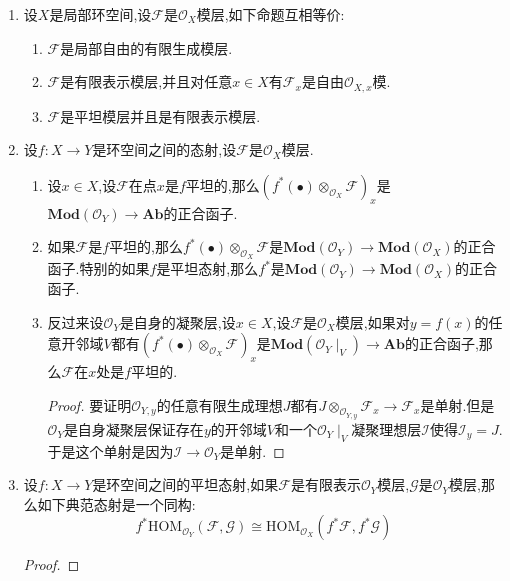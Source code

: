 \begin{enumerate}
	\item 设$X$是局部环空间,设$\mathscr{F}$是$\mathscr{O}_X$模层,如下命题互相等价:
	\begin{enumerate}
		\item $\mathscr{F}$是局部自由的有限生成模层.
		\item $\mathscr{F}$是有限表示模层,并且对任意$x\in X$有$\mathscr{F}_x$是自由$\mathscr{O}_{X,x}$模.
		\item $\mathscr{F}$是平坦模层并且是有限表示模层.
	\end{enumerate}
	\item 设$f:X\to Y$是环空间之间的态射,设$\mathscr{F}$是$\mathscr{O}_X$模层.
	\begin{enumerate}[(1)]
		\item 设$x\in X$,设$\mathscr{F}$在点$x$是$f$平坦的,那么$(f^*(\bullet)\otimes_{\mathscr{O}_X}\mathscr{F})_x$是$\textbf{Mod}(\mathscr{O}_Y)\to\textbf{Ab}$的正合函子.
		\item 如果$\mathscr{F}$是$f$平坦的,那么$f^*(\bullet)\otimes_{\mathscr{O}_X}\mathscr{F}$是$\textbf{Mod}(\mathscr{O}_Y)\to\textbf{Mod}(\mathscr{O}_X)$的正合函子.特别的如果$f$是平坦态射,那么$f^*$是$\textbf{Mod}(\mathscr{O}_Y)\to\textbf{Mod}(\mathscr{O}_X)$的正合函子.
		\item 反过来设$\mathscr{O}_Y$是自身的凝聚层,设$x\in X$,设$\mathscr{F}$是$\mathscr{O}_X$模层,如果对$y=f(x)$的任意开邻域$V$都有$(f^*(\bullet)\otimes_{\mathscr{O}_X}\mathscr{F})_x$是$\textbf{Mod}(\mathscr{O}_Y\mid_V)\to\textbf{Ab}$的正合函子,那么$\mathscr{F}$在$x$处是$f$平坦的.
		\begin{proof}
			
			要证明$\mathscr{O}_{Y,y}$的任意有限生成理想$J$都有$J\otimes_{\mathscr{O}_{Y,y}}\mathscr{F}_x\to\mathscr{F}_x$是单射.但是$\mathscr{O}_Y$是自身凝聚层保证存在$y$的开邻域$V$和一个$\mathscr{O}_Y\mid_V$凝聚理想层$\mathscr{I}$使得$\mathscr{I}_y=J$.于是这个单射是因为$\mathscr{I}\to\mathscr{O}_Y$是单射.
		\end{proof}
	\end{enumerate}
	\item 设$f:X\to Y$是环空间之间的平坦态射,如果$\mathscr{F}$是有限表示$\mathscr{O}_Y$模层,$\mathscr{G}$是$\mathscr{O}_Y$模层,那么如下典范态射是一个同构:
	$$f^*\mathrm{HOM}_{\mathscr{O}_Y}(\mathscr{F},\mathscr{G})\cong\mathrm{HOM}_{\mathscr{O}_X}(f^*\mathscr{F},f^*\mathscr{G})$$
	\begin{proof}
		

\end{proof}
\end{enumerate}

